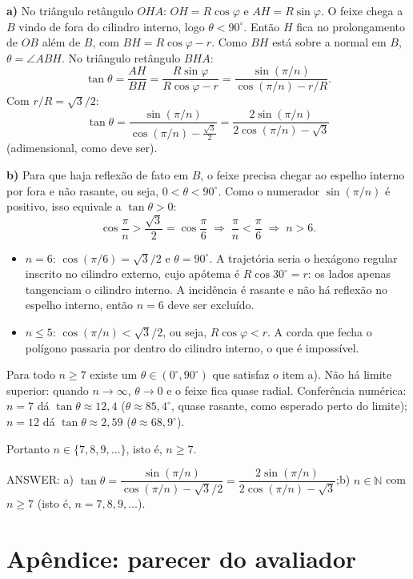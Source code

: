 \documentclass{article}%
\begin{document}
\textbf{a)} No triângulo retângulo $OHA$: $OH=R\cos\varphi$ e $AH=R\sin\varphi$. O feixe chega a $B$ vindo de fora do cilindro interno, logo $\theta<90^\circ$. Então $H$ fica no prolongamento de $OB$ além de $B$, com $BH=R\cos\varphi-r$. Como $BH$ está sobre a normal em $B$, $\theta=\angle ABH$. No triângulo retângulo $BHA$:
\[
\tan\theta=\frac{AH}{BH}=\frac{R\sin\varphi}{R\cos\varphi-r}=\frac{\sin(\pi/n)}{\cos(\pi/n)-r/R}.
\]
Com $r/R=\sqrt{3}/2$:
\[
\boxed{\tan\theta=\frac{\sin(\pi/n)}{\cos(\pi/n)-\frac{\sqrt{3}}{2}}=\frac{2\sin(\pi/n)}{2\cos(\pi/n)-\sqrt{3}}}
\]
(adimensional, como deve ser).

\textbf{b)} Para que haja reflexão de fato em $B$, o feixe precisa chegar ao espelho interno por fora e não rasante, ou seja, $0<\theta<90^\circ$. Como o numerador $\sin(\pi/n)$ é positivo, isso equivale a $\tan\theta>0$:
\[
\cos\frac{\pi}{n}>\frac{\sqrt{3}}{2}=\cos\frac{\pi}{6}
\;\Longrightarrow\;\frac{\pi}{n}<\frac{\pi}{6}
\;\Longrightarrow\; n>6 .
\]
\begin{itemize}
\item $n=6$: $\cos(\pi/6)=\sqrt{3}/2$ e $\theta=90^\circ$. A trajetória seria o hexágono regular inscrito no cilindro externo, cujo apótema é $R\cos 30^\circ=r$: os lados apenas tangenciam o cilindro interno. A incidência é rasante e não há reflexão no espelho interno, então $n=6$ deve ser excluído.
\item $n\le 5$: $\cos(\pi/n)<\sqrt{3}/2$, ou seja, $R\cos\varphi<r$. A corda que fecha o polígono passaria por dentro do cilindro interno, o que é impossível.
\end{itemize}
Para todo $n\ge 7$ existe um $\theta\in(0^\circ,90^\circ)$ que satisfaz o item a). Não há limite superior: quando $n\to\infty$, $\theta\to 0$ e o feixe fica quase radial. Conferência numérica: $n=7$ dá $\tan\theta\approx 12{,}4$ ($\theta\approx 85{,}4^\circ$, quase rasante, como esperado perto do limite); $n=12$ dá $\tan\theta\approx 2{,}59$ ($\theta\approx 68{,}9^\circ$).

Portanto $n\in\{7,8,9,\dots\}$, isto é, $n\ge 7$.

ANSWER: a) $\tan\theta=\dfrac{\sin(\pi/n)}{\cos(\pi/n)-\sqrt{3}/2}=\dfrac{2\sin(\pi/n)}{2\cos(\pi/n)-\sqrt{3}}$;\quad b) $n\in\mathbb{N}$ com $n\ge 7$ (isto é, $n=7,8,9,\dots$).%
\newpage%
\section*{Apêndice: parecer do avaliador}%
\end{document}

